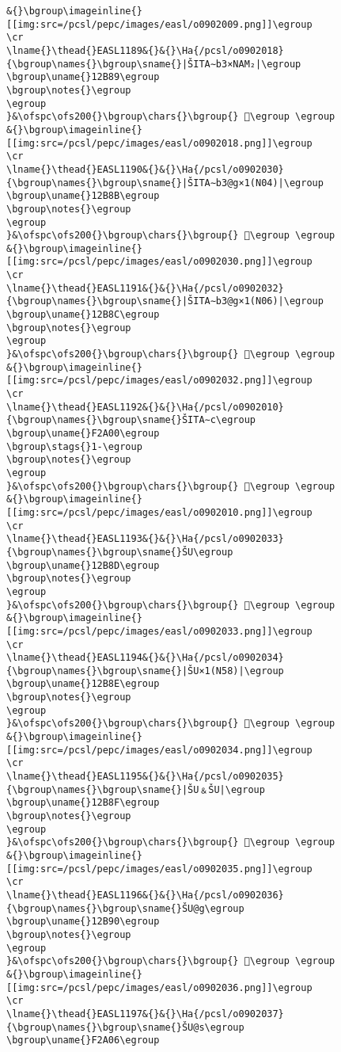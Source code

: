 \begin{verbatim}
&{}\bgroup\imageinline{}[[img:src=/pcsl/pepc/images/easl/o0902009.png]]\egroup
\cr
\lname{}\thead{}EASL1189&{}&{}\Ha{/pcsl/o0902018}{\bgroup\names{}\bgroup\sname{}|ŠITA∼b3×NAM₂|\egroup
\bgroup\uname{}12B89\egroup
\bgroup\notes{}\egroup
\egroup
}&\ofspc\ofs200{}\bgroup\chars{}\bgroup{} 𒮉\egroup \egroup
&{}\bgroup\imageinline{}[[img:src=/pcsl/pepc/images/easl/o0902018.png]]\egroup
\cr
\lname{}\thead{}EASL1190&{}&{}\Ha{/pcsl/o0902030}{\bgroup\names{}\bgroup\sname{}|ŠITA∼b3@g×1(N04)|\egroup
\bgroup\uname{}12B8B\egroup
\bgroup\notes{}\egroup
\egroup
}&\ofspc\ofs200{}\bgroup\chars{}\bgroup{} 𒮋\egroup \egroup
&{}\bgroup\imageinline{}[[img:src=/pcsl/pepc/images/easl/o0902030.png]]\egroup
\cr
\lname{}\thead{}EASL1191&{}&{}\Ha{/pcsl/o0902032}{\bgroup\names{}\bgroup\sname{}|ŠITA∼b3@g×1(N06)|\egroup
\bgroup\uname{}12B8C\egroup
\bgroup\notes{}\egroup
\egroup
}&\ofspc\ofs200{}\bgroup\chars{}\bgroup{} 𒮌\egroup \egroup
&{}\bgroup\imageinline{}[[img:src=/pcsl/pepc/images/easl/o0902032.png]]\egroup
\cr
\lname{}\thead{}EASL1192&{}&{}\Ha{/pcsl/o0902010}{\bgroup\names{}\bgroup\sname{}ŠITA∼c\egroup
\bgroup\uname{}F2A00\egroup
\bgroup\stags{}1-\egroup
\bgroup\notes{}\egroup
\egroup
}&\ofspc\ofs200{}\bgroup\chars{}\bgroup{} 󲨀\egroup \egroup
&{}\bgroup\imageinline{}[[img:src=/pcsl/pepc/images/easl/o0902010.png]]\egroup
\cr
\lname{}\thead{}EASL1193&{}&{}\Ha{/pcsl/o0902033}{\bgroup\names{}\bgroup\sname{}ŠU\egroup
\bgroup\uname{}12B8D\egroup
\bgroup\notes{}\egroup
\egroup
}&\ofspc\ofs200{}\bgroup\chars{}\bgroup{} 𒮍\egroup \egroup
&{}\bgroup\imageinline{}[[img:src=/pcsl/pepc/images/easl/o0902033.png]]\egroup
\cr
\lname{}\thead{}EASL1194&{}&{}\Ha{/pcsl/o0902034}{\bgroup\names{}\bgroup\sname{}|ŠU×1(N58)|\egroup
\bgroup\uname{}12B8E\egroup
\bgroup\notes{}\egroup
\egroup
}&\ofspc\ofs200{}\bgroup\chars{}\bgroup{} 𒮎\egroup \egroup
&{}\bgroup\imageinline{}[[img:src=/pcsl/pepc/images/easl/o0902034.png]]\egroup
\cr
\lname{}\thead{}EASL1195&{}&{}\Ha{/pcsl/o0902035}{\bgroup\names{}\bgroup\sname{}|ŠU﹠ŠU|\egroup
\bgroup\uname{}12B8F\egroup
\bgroup\notes{}\egroup
\egroup
}&\ofspc\ofs200{}\bgroup\chars{}\bgroup{} 𒮏\egroup \egroup
&{}\bgroup\imageinline{}[[img:src=/pcsl/pepc/images/easl/o0902035.png]]\egroup
\cr
\lname{}\thead{}EASL1196&{}&{}\Ha{/pcsl/o0902036}{\bgroup\names{}\bgroup\sname{}ŠU@g\egroup
\bgroup\uname{}12B90\egroup
\bgroup\notes{}\egroup
\egroup
}&\ofspc\ofs200{}\bgroup\chars{}\bgroup{} 𒮐\egroup \egroup
&{}\bgroup\imageinline{}[[img:src=/pcsl/pepc/images/easl/o0902036.png]]\egroup
\cr
\lname{}\thead{}EASL1197&{}&{}\Ha{/pcsl/o0902037}{\bgroup\names{}\bgroup\sname{}ŠU@s\egroup
\bgroup\uname{}F2A06\egroup

\end{verbatim}

